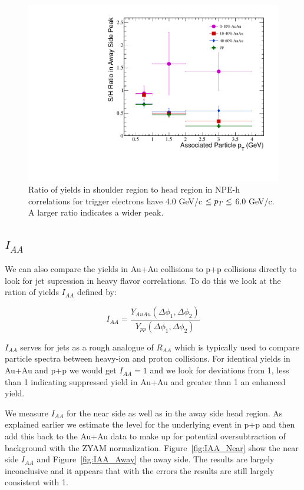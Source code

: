\begin{figure}[htbp]
\begin{center}
\includegraphics[scale=.8]{Plots/Correlations/SH_Ratio.pdf}
\end{center}
\caption[Shoulder and Head Region Yield Comparison]{Ratio of yields in shoulder region to head region in NPE-h correlations for trigger electrons have 4.0 GeV/c $\leq p_{T} \leq$ 6.0 GeV/c. A larger ratio indicates a wider peak.}
\label{fig:SH_Ratio}
\end{figure}

\subsection{$I_{AA}$}

We can also compare the yields in Au+Au collisions to p+p collisions directly to look for jet supression in heavy flavor correlations. To do this we look at the ration of yields $I_{AA}$ defined by:

\begin{equation}\label{eq:IAA}
I_{AA} = \frac{Y_{AuAu}(\Delta\phi_1, \Delta\phi_2)}{Y_{pp}(\Delta\phi_1, \Delta\phi_2)}
\end{equation} 

$I_{AA}$ serves for jets as a rough analogue of $R_{AA}$ which is typically used to compare particle spectra between heavy-ion and proton collisions. For identical yields in Au+Au and p+p we would get $I_{AA} = 1$ and we look for deviations from 1, less than 1 indicating suppressed yield in Au+Au and greater than 1 an enhanced yield.

We measure $I_{AA}$ for the near side as well as in the away side head region. As explained earlier we estimate the level for the underlying event in p+p and then add this back to the Au+Au data to make up for potential oversubtraction of background with the ZYAM normalization. Figure~\ref{fig:IAA_Near} show the near side $I_{AA}$ and Figure~\ref{fig:IAA_Away} the away side. The results are largely inconclusive and it appears that with the errors the results are still largely consistent with 1.


